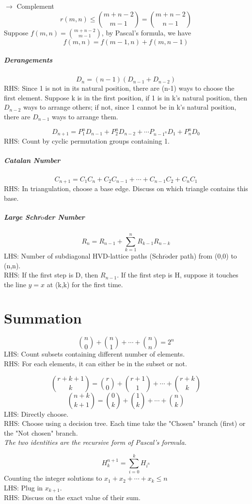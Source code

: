 \documentclass{article}
\begin{document}
	
	$ \rightarrow $ Complement\\
	$$r(m,n) \leq {m+n-2 \choose m-1} = {m+n-2 \choose n-1}$$
	Suppose $f(m,n) = {m+n-2 \choose m-1}$, by Pascal's formula, we have
	$$f(m,n)=f(m-1,n)+f(m,n-1) $$

	\subparagraph{Derangements}
	$$ D_n = (n-1)(D_{n-1} + D_{n-2})$$
	RHS: Since 1 is not in its natural position, there are (n-1) ways to choose the first element. Suppose k is in the first position, if 1 is in k's natural position, then $D_{n-2}$ ways to arrange others; if not, since 1 cannot be in k's natural position, there are $D_{n-1}$ ways to arrange them.

	$$ D_{n+1} = P_1^nD_{n-1}+P_2^nD_{n-2} + \cdots P_{n-1^n}D_1 + P_n^nD_0$$
	RHS: Count by cyclic permutation groups containing 1.

	\subparagraph{Catalan Number}
	$$ C_{n+1} = C_{1}C_{n} + C_{2}C_{n-1} + \cdots + C_{n-1}C_{2} + C_{n}C_1$$
	RHS: In triangulation, choose a base edge. Discuss on which triangle contains this base.

	\subparagraph{Large Schr$\ddot{o}$der Number}
	$$ R_n = R_{n-1} + \sum_{k=1}^n R_{k-1} R_{n-k} $$
	LHS: Number of subdiagonal HVD-lattice paths (Schr$\ddot{o}$der path) from (0,0) to (n,n).\\
	RHS: If the first step is D, then $R_{n-1}$. If the first step is H, suppose it touches the line $y=x$ at (k,k) for the first time.

	\section{Summation}
	$${n \choose 0} + {n \choose 1} + \cdots +{n \choose n} = 2^n$$
	LHS: Count subsets containing different number of elements.\\
	RHS: For each elements, it can either be in the subset or not.

	$${r+k+1 \choose k} = {r \choose 0} + {r+1 \choose 1} + \cdots + {r+k \choose k}$$
	$${n+k \choose k+1} = {0 \choose k} + {1 \choose k} + \cdots  + {n \choose k}$$
	LHS: Directly choose.\\
	RHS: Choose using a decision tree. Each time take the "Chosen" branch (first) or the "Not chosen" branch.\\
	\textit{The two identities are the recursive form of Pascal's formula.}

	$$H_{k}^{n+1} = \sum_{i=0}^{k} H_{i^n}$$
	Counting the integer solutions to $x_1 + x_2 + \cdots + x_k \leq n$\\
	LHS: Plug in $x_{k+1}$.\\
	RHS: Discuss on the exact value of their sum.
\end{document}
